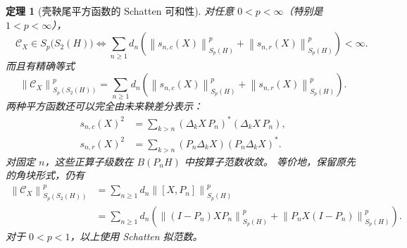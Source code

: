 \documentclass[UTF8,11pt,a4paper,fontset=fandol]{ctexart}
\newtheorem{theorem}{定理}[section]
\theoremstyle{remark}
\newcommand{\CC}{\mathcal C}
\newcommand{\norm}[1]{\left\lVert #1\right\rVert}
\numberwithin{equation}{section}
\begin{document}
\begin{theorem}[壳鞅尾平方函数的 Schatten 可和性]\label{sch:thm:main}
对任意 $0<p<\infty$（特别是 $1<p<\infty$），
\begin{equation}\label{sch:eq:criterion}
 \boxed{\quad
 \CC_X\in S_p\bigl(S_2(H)\bigr)
 \iff
 \sum_{n\geq1}d_n\left(
   \norm{s_{n,c}(X)}_{S_p(H)}^p+
   \norm{s_{n,r}(X)}_{S_p(H)}^p\right)<\infty.
 \quad}
\end{equation}
而且有精确等式
\begin{equation}\label{sch:eq:main}
 \norm{\CC_X}_{S_p(S_2(H))}^p
 =\sum_{n\geq1}d_n\left(
   \norm{s_{n,c}(X)}_{S_p(H)}^p+
   \norm{s_{n,r}(X)}_{S_p(H)}^p\right).
\end{equation}
两种平方函数还可以完全由未来鞅差分表示：
\begin{align}
 s_{n,c}(X)^2
 &=\sum_{k>n}(\Delta_kX\,P_n)^*(\Delta_kX\,P_n),
       \label{sch:eq:tail-diff-column}\\
 s_{n,r}(X)^2
 &=\sum_{k>n}(P_n\Delta_kX)(P_n\Delta_kX)^*.
       \label{sch:eq:tail-diff-row}
\end{align}
对固定 $n$，这些正算子级数在 $B(P_nH)$ 中按算子范数收敛。
等价地，保留原先的角块形式，仍有
\begin{equation}\label{sch:eq:corners}
 \begin{aligned}
 \norm{\CC_X}_{S_p(S_2(H))}^p
 &=\sum_{n\geq1}d_n\norm{[X,P_n]}_{S_p(H)}^p\\
 &=\sum_{n\geq1}d_n\left(
  \norm{(I-P_n)XP_n}_{S_p(H)}^p+
  \norm{P_nX(I-P_n)}_{S_p(H)}^p\right).
 \end{aligned}
\end{equation}
对于 $0<p<1$，以上使用 Schatten 拟范数。
\end{theorem}
\end{document}
